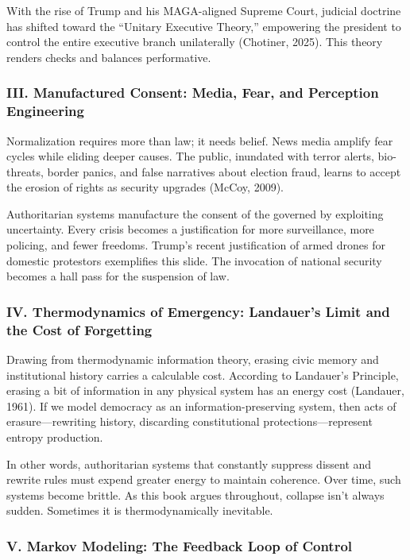 \documentclass[
]{article}
\begin{document}
With the rise of Trump and his MAGA-aligned Supreme Court, judicial doctrine has shifted toward the ``Unitary Executive Theory,'' empowering the president to control the entire executive branch unilaterally (Chotiner, 2025). This theory renders checks and balances performative.

\subsubsection{III. Manufactured Consent: Media, Fear, and Perception Engineering}\label{iii.-manufactured-consent-media-fear-and-perception-engineering}

Normalization requires more than law; it needs belief. News media amplify fear cycles while eliding deeper causes. The public, inundated with terror alerts, bio-threats, border panics, and false narratives about election fraud, learns to accept the erosion of rights as security upgrades (McCoy, 2009).

Authoritarian systems manufacture the consent of the governed by exploiting uncertainty. Every crisis becomes a justification for more surveillance, more policing, and fewer freedoms. Trump's recent justification of armed drones for domestic protestors exemplifies this slide. The invocation of national security becomes a hall pass for the suspension of law.

\subsubsection{IV. Thermodynamics of Emergency: Landauer's Limit and the Cost of Forgetting}\label{iv.-thermodynamics-of-emergency-landauers-limit-and-the-cost-of-forgetting}

Drawing from thermodynamic information theory, erasing civic memory and institutional history carries a calculable cost. According to Landauer's Principle, erasing a bit of information in any physical system has an energy cost (Landauer, 1961). If we model democracy as an information-preserving system, then acts of erasure---rewriting history, discarding constitutional protections---represent entropy production.

In other words, authoritarian systems that constantly suppress dissent and rewrite rules must expend greater energy to maintain coherence. Over time, such systems become brittle. As this book argues throughout, collapse isn't always sudden. Sometimes it is thermodynamically inevitable.

\subsubsection{V. Markov Modeling: The Feedback Loop of Control}\label{v.-markov-modeling-the-feedback-loop-of-control}
\end{document}
